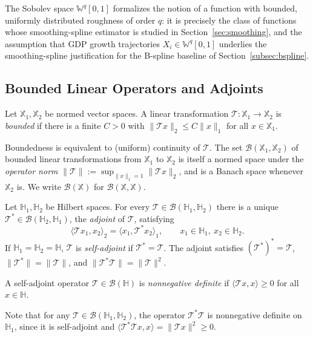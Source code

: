 The Sobolev space $\mathbb{W}^q[0,1]$ formalizes the notion of a function
with bounded, uniformly distributed roughness of order $q$: it is precisely
the class of functions whose smoothing-spline estimator is studied in
Section~\ref{sec:smoothing}, and the assumption that GDP growth
trajectories $X_i\in\mathbb{W}^q[0,1]$ underlies the smoothing-spline
justification for the B-spline baseline of Section~\ref{subsec:bspline}.

\subsection{Bounded Linear Operators and Adjoints}

\begin{definition}
Let $\mathbb{X}_1,\mathbb{X}_2$ be normed vector spaces. A linear
transformation $\mathcal{T}:\mathbb{X}_1\to\mathbb{X}_2$ is \emph{bounded}
if there is a finite $C>0$ with $\|\mathcal{T}x\|_2\leq C\|x\|_1$ for all
$x\in\mathbb{X}_1$.
\end{definition}
Boundedness is equivalent to (uniform) continuity of
$\mathcal{T}$. The set $\mathcal{B}(\mathbb{X}_1,\mathbb{X}_2)$ of bounded
linear transformations from $\mathbb{X}_1$ to $\mathbb{X}_2$ is itself a normed
space under the \emph{operator norm}
$\|\mathcal{T}\| := \sup_{\|x\|_1=1}\|\mathcal{T}x\|_2$, and is a Banach
space whenever $\mathbb{X}_2$ is. We write $\mathcal{B}(\mathbb{X})$ for
$\mathcal{B}(\mathbb{X},\mathbb{X})$.

\begin{theorem}
\label{thm:adjoint}
Let $\mathbb{H}_1,\mathbb{H}_2$ be Hilbert spaces. For every
$\mathcal{T}\in\mathcal{B}(\mathbb{H}_1,\mathbb{H}_2)$ there is a unique
$\mathcal{T}^*\in\mathcal{B}(\mathbb{H}_2,\mathbb{H}_1)$, the
\emph{adjoint} of $\mathcal{T}$, satisfying
\begin{equation}
\langle\mathcal{T}x_1,x_2\rangle_2 = \langle x_1,\mathcal{T}^*x_2\rangle_1,
\qquad x_1\in\mathbb{H}_1,\ x_2\in\mathbb{H}_2.
\label{eq:adjoint}
\end{equation}
If $\mathbb{H}_1=\mathbb{H}_2=\mathbb{H}$, $\mathcal{T}$ is
\emph{self-adjoint} if $\mathcal{T}^*=\mathcal{T}$. The adjoint satisfies
$(\mathcal{T}^*)^*=\mathcal{T}$, $\|\mathcal{T}^*\|=\|\mathcal{T}\|$, and
$\|\mathcal{T}^*\mathcal{T}\|=\|\mathcal{T}\|^2$.
\end{theorem}

\begin{definition}
\label{def:nonneg_operator}
A self-adjoint operator $\mathcal{T}\in\mathcal{B}(\mathbb{H})$ is
\emph{nonnegative definite} if $\langle\mathcal{T}x,x\rangle\geq 0$ for all
$x\in\mathbb{H}$. 
\end{definition}
Note that for any $\mathcal{T}\in\mathcal{B}(\mathbb{H}_1,
\mathbb{H}_2)$, the operator $\mathcal{T}^*\mathcal{T}$ is nonnegative
definite on $\mathbb{H}_1$, since it is self-adjoint and
$\langle\mathcal{T}^*\mathcal{T}x,x\rangle = \|\mathcal{T}x\|^2\geq 0$.

